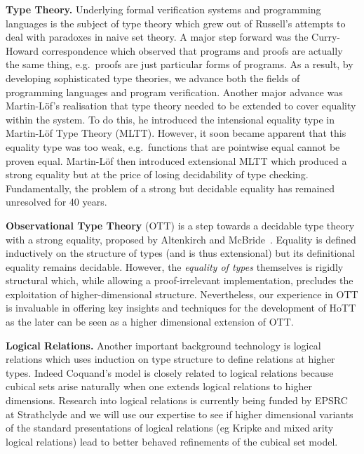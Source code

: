 \documentclass[a4paper,11pt]{article}
\newcommand{\eg}{{e.g.}\ }
\begin{document}
{\bf Type Theory.} Underlying formal verification systems and
programming languages is the subject of type theory which grew out of
Russell's attempts to deal with paradoxes in naive set theory. A major
step forward was the Curry-Howard correspondence which observed that
programs and proofs are actually the same thing, \eg proofs are just
particular forms of programs. As a result, by developing sophisticated
type theories, we advance both the fields of programming languages and
program verification. Another major advance was Martin-L\"of's realisation
that type theory needed to be extended to cover equality within the
system. To do this, he introduced the intensional equality type in
Martin-L\"of Type Theory (MLTT).  However, it soon became apparent
that this equality type was too weak, \eg functions that are pointwise
equal cannot be proven equal. Martin-L\"of then
introduced extensional MLTT which produced a strong equality but at
the price of losing decidability of type checking. Fundamentally, the
problem of a strong but decidable equality has remained
unresolved for 40 years.


{\bf Observational Type Theory} (OTT) is a step towards a decidable
type theory with a strong equality, proposed by Altenkirch and
McBride~\cite{alti:ott-conf}. Equality is
defined inductively on the structure of types (and is thus extensional) but its definitional equality remains decidable. However,
the {\em equality of types} themselves is rigidly structural which, while
allowing a proof-irrelevant implementation, precludes the exploitation
of higher-dimensional structure. Nevertheless, our experience in OTT is
invaluable in offering key insights and techniques for the development
of HoTT as the later can be seen as a higher
dimensional extension of OTT.

{\bf Logical Relations.} Another important background technology is
logical relations which uses induction on type structure to define
relations at higher types. Indeed Coquand's model is closely related
to logical relations because cubical sets arise naturally when one
extends logical relations to higher dimensions. Research into logical
relations is currently being funded by EPSRC at Strathclyde and we
will use our expertise to see if higher dimensional variants of the
standard presentations of logical relations (eg Kripke and mixed arity
logical relations) lead to better behaved refinements of the cubical
set model.



\end{document}
